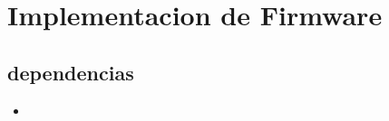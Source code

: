 \chapter[Implementación de Firmware]{Implementacion de Firmware}
\label{cp:Firmware}
{
    \section{dependencias}
    \begin{itemize}
        \item
    \end{itemize}


}
